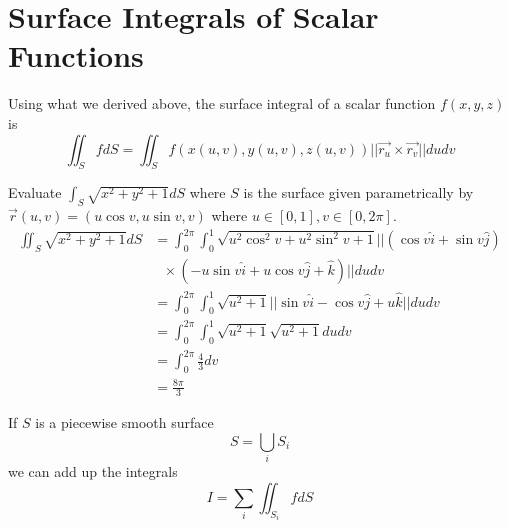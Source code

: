 \documentclass[12pt]{article}
\begin{document}
\section{Surface Integrals of Scalar Functions}
Using what we derived above, the surface integral of a scalar function $f(x,y,z)$ is
$$\iint_S fdS = \iint_S f(x(u,v),y(u,v),z(u,v))||\vec{r_u}\times\vec{r_v}||dudv$$

\begin{ex}
	Evaluate $\int_S\sqrt{x^2+y^2+1}dS$ where $S$ is the surface given parametrically by $\vec{r}(u,v) = (u\cos v,u\sin v,v)$ where $u\in[0,1],v\in[0,2\pi]$.
	\begin{align*}
		\iint_S\sqrt{x^2+y^2+1}dS &= \int_0^{2\pi}\int_0^1 \sqrt{u^2\cos^2v+u^2\sin^2v+1}||(\cos v\hat{i} + \sin v\hat{j}) \\
					  &\text{ } \times (-u\sin v\hat{i} + u\cos v\hat{j} + \hat{k})|| dudv \\
					  &= \int_0^{2\pi}\int_0^1 \sqrt{u^2+1}||\sin v\hat{i} - \cos v\hat{j} + u\hat{k}|| dudv \\
					  &= \int_0^{2\pi}\int_0^1 \sqrt{u^2+1}\sqrt{u^2+1} dudv \\
					  &= \int_0^{2\pi} \frac{4}{3} dv \\
					  &= \frac{8\pi}{3}
	\end{align*}
\end{ex}

If $S$ is a piecewise smooth surface
$$S = \bigcup_i S_i$$
we can add up the integrals
$$I = \sum_i \iint_{S_i} fdS$$
\end{document}
